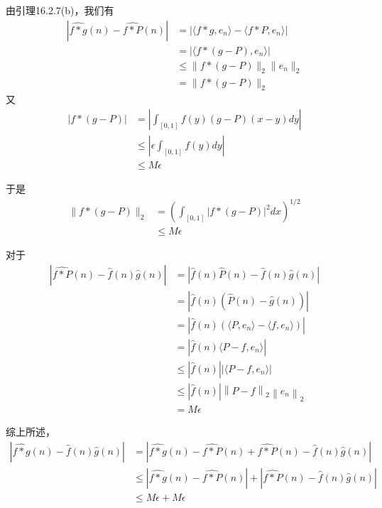 \documentclass{article}
\begin{document}
\begin{itemize}
        由引理16.2.7(b)，我们有
        \begin{align*}
          \left|\widehat{f \ast g}(n) - \widehat{f \ast P}(n)\right|
           & = \left|\langle f \ast g, e_n \rangle - \langle f \ast P, e_n \rangle\right| \\
           & = \left|\langle f \ast (g - P), e_n \rangle \right|                          \\
           & \leq \|f \ast (g - P)\|_2 \|e_n\|_2                                          \\
           & = \|f \ast (g - P)\|_2
        \end{align*}
        又
        \begin{align*}
          \left| f \ast (g - P)\right|
           & = \left| \int_{[0, 1]}f(y) (g - P)(x - y) dy \right| \\
           & \leq \left| \epsilon \int_{[0, 1]}f(y) dy \right|    \\
           & \leq M \epsilon
        \end{align*}

        于是
        \begin{align*}
          \|f \ast (g - P)\|_2
           & = \left(\int_{[0, 1]} |f \ast (g - P)|^2 dx\right)^{1/2} \\
           & \leq M\epsilon
        \end{align*}

        对于
        \begin{align*}
          \left|\widehat{f \ast P}(n) - \hat{f}(n) \hat{g}(n)\right|
           & = \left|\hat{f}(n)\hat{P}(n) - \hat{f}(n) \hat{g}(n)\right|                \\
           & = \left|\hat{f}(n)(\hat{P}(n) - \hat{g}(n))\right|                         \\
           & = \left|\hat{f}(n)(\langle P, e_n \rangle - \langle f, e_n \rangle)\right| \\
           & = \left|\hat{f}(n)\langle P - f, e_n \rangle\right|                        \\
           & \leq |\hat{f}(n)|\left|\langle P - f, e_n \rangle\right|                   \\
           & \leq |\hat{f}(n)|\left\|P - f\right\|_2\left\|e_n \right\|_2               \\
           & = M\epsilon
        \end{align*}

        综上所述，
        \begin{align*}
          \left|\widehat{f \ast g}(n) - \hat{f}(n) \hat{g}(n)\right|
           & = \left|\widehat{f \ast g}(n) - \widehat{f \ast P}(n) + \widehat{f \ast P}(n) - \hat{f}(n) \hat{g}(n)\right|                 \\
           & \leq \left|\widehat{f \ast g}(n) - \widehat{f \ast P}(n)\right| + \left|\widehat{f \ast P}(n) - \hat{f}(n) \hat{g}(n)\right| \\
           & \leq M \epsilon + M \epsilon
        \end{align*}


\end{itemize}
\end{document}
